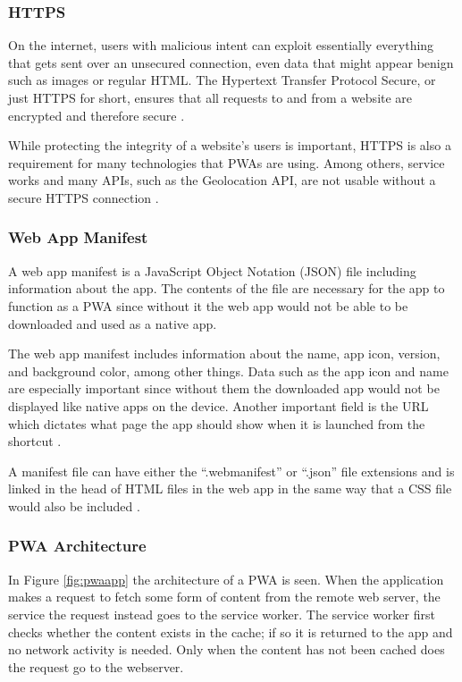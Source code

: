 \documentclass[a4paper,12pt]{article}
\begin{document}
\subsubsection{HTTPS}
\label{Theory_PWA_HTTPS}
On the internet, users with malicious intent can exploit essentially everything that gets sent over an unsecured connection, even data that might appear benign such as images or regular HTML. The Hypertext Transfer Protocol Secure, or just HTTPS for short, ensures that all requests to and from a website are encrypted and therefore secure \cite{why_https_matters}.

While protecting the integrity of a website’s users is important, HTTPS is also a requirement for many technologies that PWAs are using. Among others, service works and many APIs, such as the Geolocation API, are not usable without a secure HTTPS connection \cite{why_https_matters}.

\subsubsection{Web App Manifest}
\label{Theory_PWA_webManifest}
A web app manifest is a JavaScript Object Notation (JSON) file including information about the app. The contents of the file are necessary for the app to function as a PWA since without it the web app would not be able to be downloaded and used as a native app.

The web app manifest includes information about the name, app icon, version, and background color, among other things. Data such as the app icon and name are especially important since without them the downloaded app would not be displayed like native apps on the device. Another important field is the URL which dictates what page the app should show when it is launched from the shortcut \cite{mozilla_webmanifest}.

A manifest file can have either the “.webmanifest” or “.json” file extensions and is linked in the head of HTML files in the web app in the same way that a CSS file would also be included \cite{mozilla_webmanifest}.

\subsubsection{PWA Architecture}
\label{Theory_PWA_architecture}
In Figure \ref{fig:pwaapp} the architecture of a PWA is seen. When the application makes a request to fetch some form of content from the remote web server, the service the request instead goes to the service worker. The service worker first checks whether the content exists in the cache; if so it is returned to the app and no network activity is needed. Only when the content has not been cached does the request go to the webserver.
\end{document}
